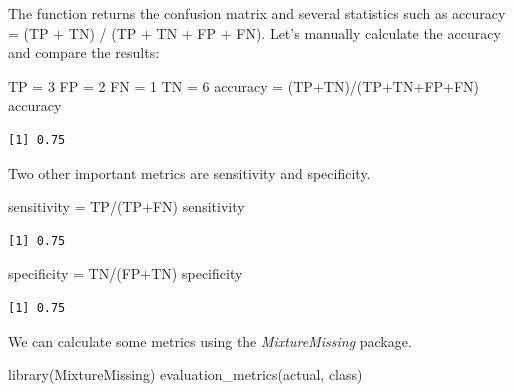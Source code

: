 \documentclass[
  letterpaper,
]{book}
\newenvironment{Shaded}{\begin{snugshade}}{\end{snugshade}}
\newcommand{\DecValTok}[1]{\textcolor[rgb]{0.68,0.00,0.00}{#1}}
\newcommand{\FunctionTok}[1]{\textcolor[rgb]{0.28,0.35,0.67}{#1}}
\newcommand{\NormalTok}[1]{\textcolor[rgb]{0.00,0.23,0.31}{#1}}
\newcommand{\OtherTok}[1]{\textcolor[rgb]{0.00,0.23,0.31}{#1}}
\newcommand{\SpecialCharTok}[1]{\textcolor[rgb]{0.37,0.37,0.37}{#1}}
\begin{document}
The function returns the confusion matrix and several statistics such as
accuracy = (TP + TN) / (TP + TN + FP + FN). Let's manually calculate the
accuracy and compare the results:

\begin{Shaded}
\begin{Highlighting}[]
\NormalTok{TP }\OtherTok{=} \DecValTok{3}
\NormalTok{FP }\OtherTok{=} \DecValTok{2}
\NormalTok{FN }\OtherTok{=} \DecValTok{1}
\NormalTok{TN }\OtherTok{=} \DecValTok{6}
\NormalTok{accuracy }\OtherTok{=}\NormalTok{ (TP}\SpecialCharTok{+}\NormalTok{TN)}\SpecialCharTok{/}\NormalTok{(TP}\SpecialCharTok{+}\NormalTok{TN}\SpecialCharTok{+}\NormalTok{FP}\SpecialCharTok{+}\NormalTok{FN)}
\NormalTok{accuracy}
\end{Highlighting}
\end{Shaded}

\begin{verbatim}
[1] 0.75
\end{verbatim}

Two other important metrics are sensitivity and specificity.

\begin{Shaded}
\begin{Highlighting}[]
\NormalTok{sensitivity }\OtherTok{=}\NormalTok{ TP}\SpecialCharTok{/}\NormalTok{(TP}\SpecialCharTok{+}\NormalTok{FN)}
\NormalTok{sensitivity}
\end{Highlighting}
\end{Shaded}

\begin{verbatim}
[1] 0.75
\end{verbatim}

\begin{Shaded}
\begin{Highlighting}[]
\NormalTok{specificity }\OtherTok{=}\NormalTok{ TN}\SpecialCharTok{/}\NormalTok{(FP}\SpecialCharTok{+}\NormalTok{TN)}
\NormalTok{specificity}
\end{Highlighting}
\end{Shaded}

\begin{verbatim}
[1] 0.75
\end{verbatim}

We can calculate some metrics using the \emph{MixtureMissing} package.

\begin{Shaded}
\begin{Highlighting}[]
\FunctionTok{library}\NormalTok{(MixtureMissing)}
\FunctionTok{evaluation\_metrics}\NormalTok{(actual, class)}
\end{Highlighting}
\end{Shaded}
\end{document}
